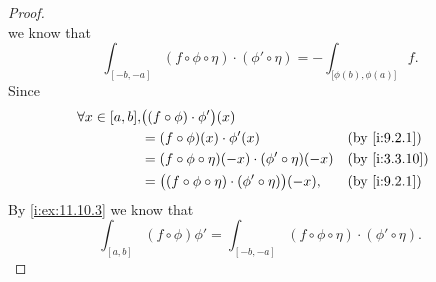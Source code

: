 \begin{proof}
\[  \]
  we know that
  \[
    \int_{[-b, -a]} (f \circ \phi \circ \eta) \cdot (\phi' \circ \eta) = -\int_{\big[\phi(b), \phi(a)\big]} f.
  \]
  Since
  \begin{align*}
    \forall x \in [a, b], & \big((f \circ \phi) \cdot \phi'\big)(x)                                                \\
                          & = (f \circ \phi)(x) \cdot \phi'(x)                                  &  & \by{i:9.2.1}  \\
                          & = (f \circ \phi \circ \eta)(-x) \cdot (\phi' \circ \eta)(-x)        &  & \by{i:3.3.10} \\
                          & = \big((f \circ \phi \circ \eta) \cdot (\phi' \circ \eta)\big)(-x), &  & \by{i:9.2.1}
  \end{align*}
  By \cref{i:ex:11.10.3} we know that
  \[
    \int_{[a, b]} (f \circ \phi) \phi' = \int_{[-b, -a]} (f \circ \phi \circ \eta) \cdot (\phi' \circ \eta).
  \]
\end{proof}
